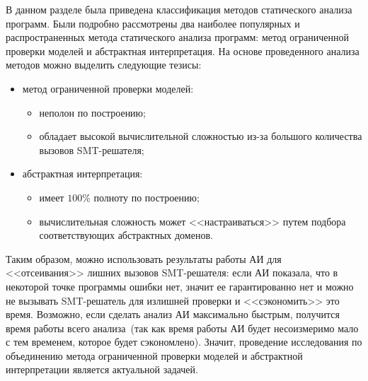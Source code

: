 В данном разделе была приведена классификация методов статического анализа 
программ. Были подробно рассмотрены два наиболее популярных и распространенных
метода статического анализа программ: метод ограниченной проверки моделей и
абстрактная интерпретация. На основе проведенного анализа методов можно 
выделить следующие тезисы:
\begin{itemize}
\item метод ограниченной проверки моделей:
	\begin{itemize}
	\item неполон по построению;
	\item обладает высокой вычислительной сложностью из-за большого количества
	вызовов SMT-решателя;
	\end{itemize}
\item абстрактная интерпретация:
	\begin{itemize}
	\item имеет $100\%$ полноту по построению;
	\item вычислительная сложность может <<настраиваться>> путем подбора
	соответствующих абстрактных доменов.
	\end{itemize}
\end{itemize}


Таким образом, можно использовать результаты работы АИ для <<отсеивания>> 
лишних вызовов SMT-решателя: если АИ показала, что в некоторой точке программы 
ошибки нет, значит ее гарантированно нет и можно не вызывать SMT-решатель для 
излишней проверки и <<сэкономить>> это время. Возможно, если сделать анализ АИ 
максимально быстрым, получится время работы всего анализа~(так как время 
работы АИ будет несоизмеримо мало с тем временем, которое будет сэкономлено).
Значит, проведение исследования по объединению метода ограниченной проверки
моделей и абстрактной интерпретации является актуальной задачей.